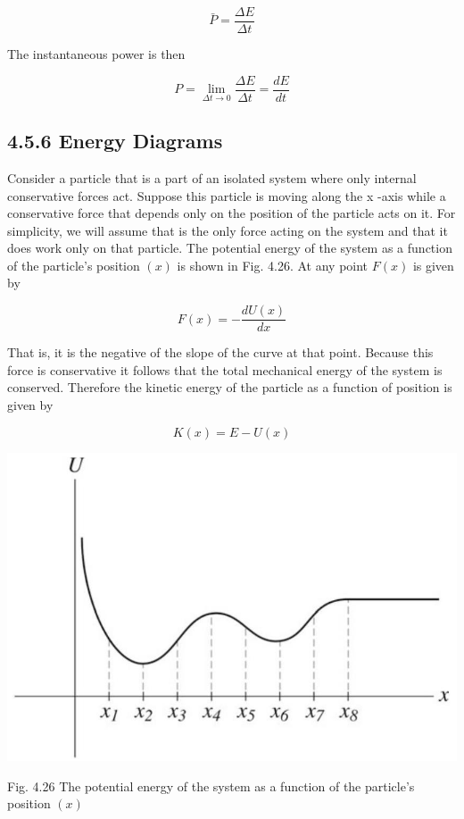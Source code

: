 \documentclass[10pt]{article}
\begin{document}
$$
\bar{P}=\frac{\Delta E}{\Delta t}
$$

The instantaneous power is then

$$
P=\lim _{\Delta t \rightarrow 0} \frac{\Delta E}{\Delta t}=\frac{d E}{d t}
$$

\subsection*{4.5.6 Energy Diagrams}
Consider a particle that is a part of an isolated system where only internal conservative forces act. Suppose this particle is moving along the x -axis while a conservative force that depends only on the position of the particle acts on it. For simplicity, we will assume that is the only force acting on the system and that it does work only on that particle. The potential energy of the system as a function of the particle's position $(x)$ is shown in Fig. 4.26. At any point $F(x)$ is given by

$$
F(x)=-\frac{d U(x)}{d x}
$$

That is, it is the negative of the slope of the curve at that point. Because this force is conservative it follows that the total mechanical energy of the system is conserved. Therefore the kinetic energy of the particle as a function of position is given by

$$
K(x)=E-U(x)
$$

\begin{center}
\includegraphics[max width=\textwidth]{2024_09_13_db1f357d2aad0a03eb2eg-077}
\end{center}

Fig. 4.26 The potential energy of the system as a function of the particle's position $(x)$
\end{document}
